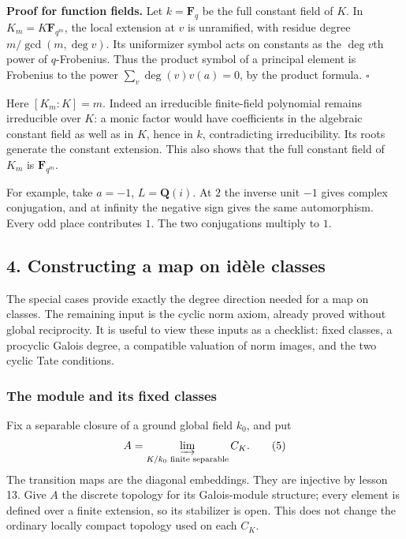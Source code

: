 \documentclass[11pt,a4paper]{article}
\begin{document}
\textbf{Proof for function fields.} Let \(k=\mathbf F_q\) be the full
constant field of \(K\). In \(K_m=K\mathbf F_{q^m}\), the local
extension at \(v\) is unramified, with residue degree
\(m/\gcd(m,\deg v)\). Its uniformizer symbol acts on constants as the
\(\deg v\)th power of \(q\)-Frobenius. Thus the product symbol of a
principal element is Frobenius to the power \(\sum_v\deg(v)v(a)=0\), by
the product formula. \(\square\)

Here \([K_m:K]=m\). Indeed an irreducible finite-field polynomial
remains irreducible over \(K\): a monic factor would have coefficients
in the algebraic constant field as well as in \(K\), hence in \(k\),
contradicting irreducibility. Its roots generate the constant extension.
This also shows that the full constant field of \(K_m\) is
\(\mathbf F_{q^m}\).

For example, take \(a=-1\), \(L=\mathbf Q(i)\). At \(2\) the inverse
unit \(-1\) gives complex conjugation, and at infinity the negative sign
gives the same automorphism. Every odd place contributes \(1\). The two
conjugations multiply to \(1\).

\subsection{4. Constructing a map on idèle
classes}\label{constructing-a-map-on-iduxe8le-classes}

The special cases provide exactly the degree direction needed for a map
on classes. The remaining input is the cyclic norm axiom, already proved
without global reciprocity. It is useful to view these inputs as a
checklist: fixed classes, a procyclic Galois degree, a compatible
valuation of norm images, and the two cyclic Tate conditions.

\subsubsection{The module and its fixed
classes}\label{the-module-and-its-fixed-classes}

Fix a separable closure of a ground global field \(k_0\), and put \[
A=\varinjlim_{K/k_0\text{ finite separable}}C_K.
\tag{5}
\] The transition maps are the diagonal embeddings. They are injective
by lesson 13. Give \(A\) the discrete topology for its Galois-module
structure; every element is defined over a finite extension, so its
stabilizer is open. This does not change the ordinary locally compact
topology used on each \(C_K\).
\end{document}
